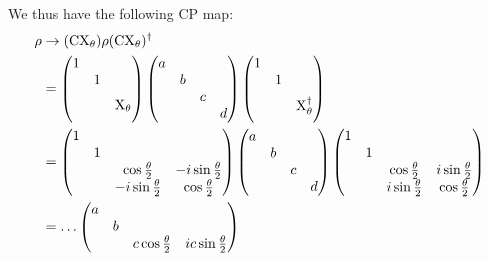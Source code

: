 \begin{parts}
	We thus have the following CP map:
	\begin{align*}
		\rho &\rightarrow (\mathrm{CX}_\theta) \rho (\mathrm{CX}_\theta)^\dag \\
		&= \begin{pmatrix}
			1 & & & \\
			& 1 & & \\
			& & \multicolumn{2}{c}{\multirow{2}{*}{$\mathrm{X}_\theta$}} \\
			& & \multicolumn{2}{c}{}
		\end{pmatrix}
		\begin{pmatrix}
			a & & & \\
			& b & & \\
			& & c & \\
			& & & d
		\end{pmatrix}
		\begin{pmatrix}
			1 & & & \\
			& 1 & & \\
			& & \multicolumn{2}{c}{\multirow{2}{*}{$\mathrm{X}_\theta^\dag$}} \\
			& & \multicolumn{2}{c}{}
		\end{pmatrix} \\
		&= \begin{pmatrix}
			1 & & & \\
			& 1 & & \\
			& & \cos\frac{\theta}{2} & -i\sin\frac{\theta}{2} \\
			& & -i\sin\frac{\theta}{2} & \cos\frac{\theta}{2}
		\end{pmatrix}
		\begin{pmatrix}
			a & & & \\
			& b & & \\
			& & c & \\
			& & & d
		\end{pmatrix}
		\begin{pmatrix}
			1 & & & \\
			& 1 & & \\
			& & \cos\frac{\theta}{2} & i\sin\frac{\theta}{2} \\
			& & i\sin\frac{\theta}{2} & \cos\frac{\theta}{2}
		\end{pmatrix} \\
		&= \ldots \begin{pmatrix}
			a & & & \\
			& b & & \\
			& & c \cos\frac{\theta}{2} & ic \sin\frac{\theta}{2} \\

\end{pmatrix}
\end{align*}
\end{parts}
